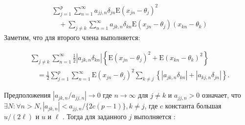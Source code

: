 \begin{align*}
    & \sum_{j=1}^{p} \sum_{n=1}^{\infty} a_{j j, n} \delta_{j n} \mathrm{E}\left(x_{j n}-\theta_{j}\right)^{2} \\
    & \quad+\sum_{j \neq k} \sum_{n=1}^{\infty} a_{j k, n} \delta_{k n} \mathrm{E}\left(x_{j n}-\theta_{j}\right)\left(x_{k n}-\theta_{k}\right) \tag{A2}
\end{align*}
Заметим, что для второго члена выполняется:

\begin{equation}
    \begin{aligned}
        & \sum_{j \neq k} \sum_{n=1}^{\infty} \frac{1}{2}\left|a_{j k, n} \delta_{k n}\right|\left\{\mathrm{E}\left(x_{j n}-\theta_{j}\right)^{2}+\mathrm{E}\left(x_{k n}-\theta_{k}\right)^{2}\right\} \\
        & \quad=\frac{1}{2} \sum_{j=1}^{p} \sum_{n=1}^{\infty} \mathrm{E}\left(x_{j n}-\theta_{j}\right)^{2} \sum_{k \neq j}\left\{\left|a_{j k, n} \delta_{k n}\right|+\left|a_{k j, n} \delta_{j n}\right|\right\} .
    \end{aligned}
\end{equation}

Предположения $\left|a_{j k, n} / a_{j j, n}\right| \rightarrow 0$ где $n \rightarrow \infty$ для $j \neq k$ и $a_{j j, n}>0$
означает, что $\exists N: \forall n>N,\left|a_{j k, n}\right|<a_{j j, n} /\{2 c(p-1)\}, k \neq j$, 
где $c$ константа большая $u /(2 \ell)$ и $u$ и $\ell$ . Тогда для заданного $j$ выполняется :

